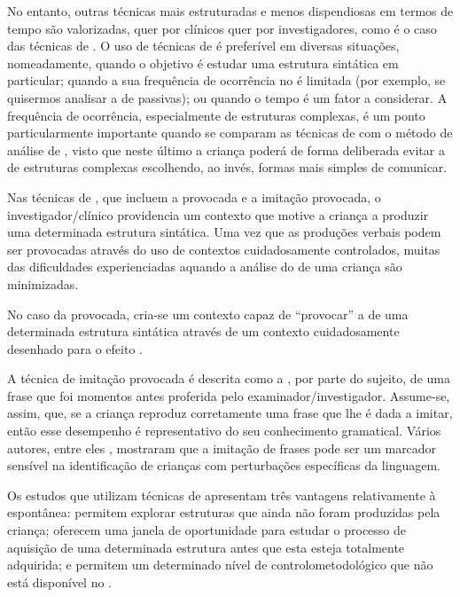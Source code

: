 \documentclass[output=paper]{LSP/langsci}
\begin{document}
No entanto, outras técnicas mais estruturadas e menos dispendiosas em termos de tempo são valorizadas, quer por clínicos quer por investigadores, como é o caso das técnicas de . O uso de técnicas de  é preferível em diversas situações, nomeadamente, quando o objetivo é estudar uma estrutura sintática em particular; quando a sua frequência de ocorrência no  é limitada (por exemplo, se quisermos analisar a  de passivas); ou quando o tempo é um fator a considerar. A frequência de ocorrência, especialmente de estruturas complexas, é um ponto particularmente importante quando se comparam as técnicas de  com o método de análise de , visto que neste último a criança poderá de forma deliberada  evitar a  de estruturas complexas escolhendo, ao invés, formas mais simples de comunicar.

Nas técnicas de , que incluem a  provocada e a imitação provocada, o investigador/clínico providencia um contexto que motive a criança a produzir uma determinada estrutura sintática. Uma vez que as produções verbais podem ser provocadas através do uso de contextos cuidadosamente controlados, muitas das dificuldades experienciadas aquando a análise do  de uma criança são minimizadas. 

No caso da  provocada, cria-se um contexto capaz de ``provocar'' a  de uma determinada estrutura sintática através de um contexto cuidadosamente desenhado para o efeito \citep{thornton1998}.

A técnica de imitação provocada é descrita como a , por parte do sujeito, de uma frase que foi momentos antes proferida pelo examinador/investiga\-dor. Assume-se, assim, que, se a criança reproduz corretamente uma frase que lhe é dada a imitar, então esse desempenho é representativo do seu conhecimento gramatical. Vários autores, entre eles \cite{contiramsden_etal2001}, mostraram que a imitação de frases pode ser um marcador sensível na identificação de crianças com perturbações específicas da linguagem. 

Os estudos que utilizam técnicas de  apresentam três vantagens relativamente à  espontânea: permitem explorar estruturas que ainda não foram produzidas pela criança; oferecem uma janela de oportunidade para estudar o processo de aquisição de uma determinada estrutura antes que esta esteja totalmente adquirida; e permitem um determinado nível de controlo\largerpage metodológico que não está disponível no  \citep{hirshpasekgolinkoff1996}.
\end{document}
